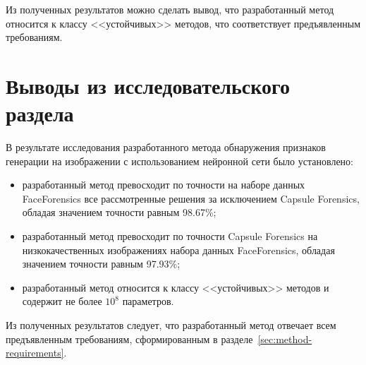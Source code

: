 \newpage

Из полученных результатов можно сделать вывод, что разработанный метод относится к классу <<устойчивых>> методов, что соответствует предъявленным требованиям.

\section{Выводы из исследовательского раздела}

В результате исследования разработанного метода обнаружения признаков генерации на изображении с использованием нейронной сети было установлено:
\begin{itemize}
	\item разработанный метод превосходит по точности на наборе данных FaceForensics все рассмотренные решения за исключением Capsule Forensics, обладая значением точности равным 98.67\%;
	\item разработанный метод превосходит по точности Capsule Forensics на низкокачественных изображениях набора данных FaceForensics, обладая значением точности равным 97.93\%;
	\item разработанный метод относится к классу <<устойчивых>> методов и содержит не более $10^8$ параметров.
\end{itemize}

Из полученных результатов следует, что разработанный метод отвечает всем предъявленным требованиям, сформированным в разделе~\ref{sec:method-requirements}.